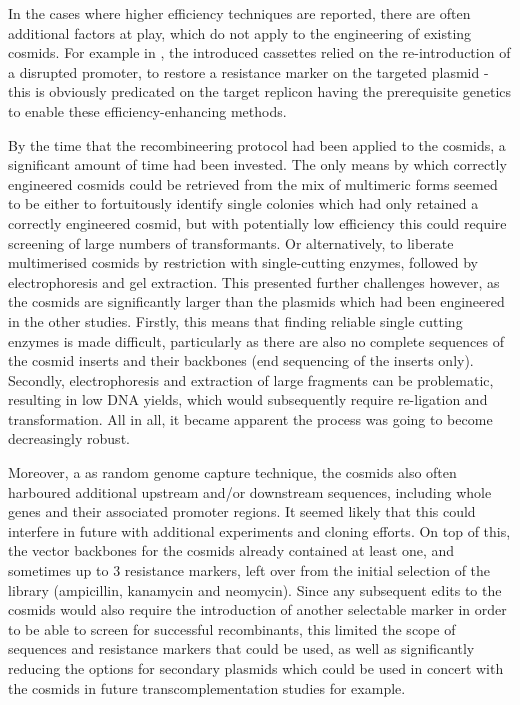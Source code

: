 In the cases where higher efficiency techniques are reported, there are often additional factors at play, which do not apply to the engineering of existing cosmids. For example in \cite{Yosef2004}, the introduced cassettes relied on the re-introduction of a disrupted promoter, to restore a resistance marker on the targeted plasmid - this is obviously predicated on the target replicon having the prerequisite genetics to enable these efficiency-enhancing methods.

By the time that the recombineering protocol had been applied to the cosmids, a significant amount of time had been invested. The only means by which correctly engineered cosmids could be retrieved from the mix of multimeric forms seemed to be either to fortuitously identify single colonies which had only retained a correctly engineered cosmid, but with potentially low efficiency this could require screening of large numbers of transformants. Or alternatively, to liberate multimerised cosmids by restriction with single-cutting enzymes, followed by electrophoresis and gel extraction. This presented further challenges however, as the cosmids are significantly larger than the plasmids which had been engineered in the other studies. Firstly, this means that finding reliable single cutting enzymes is made difficult, particularly as there are also no complete sequences of the cosmid inserts and their backbones (end sequencing of the inserts only). Secondly, electrophoresis and extraction of large fragments can be problematic, resulting in low DNA yields, which would subsequently require re-ligation and transformation. All in all, it became apparent the process was going to become decreasingly robust.

Moreover, a as random genome capture technique, the cosmids also often harboured additional upstream and/or downstream sequences, including whole genes and their associated promoter regions. It seemed likely that this could interfere in future with additional experiments and cloning efforts. On top of this, the vector backbones for the cosmids already contained at least one, and sometimes up to 3 resistance markers, left over from the initial selection of the library (ampicillin, kanamycin and neomycin). Since any subsequent edits to the cosmids would also require the introduction of another selectable marker in order to be able to screen for successful recombinants, this limited the scope of sequences and resistance markers that could be used, as well as significantly reducing the options for secondary plasmids which could be used in concert with the cosmids in future transcomplementation studies for example.

